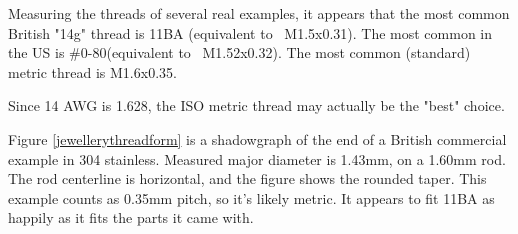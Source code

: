 Measuring the threads of several real examples, it appears that the most common British "14g" thread is 11BA (equivalent to ~M1.5x0.31).  The most common in the US is \#0-80(equivalent to ~M1.52x0.32).  The most common (standard) metric thread is M1.6x0.35.

Since 14 AWG is 1.628, the ISO metric thread may actually be the "best" choice.

Figure \ref{jewellerythreadform} is a shadowgraph of the end of a British commercial example in 304 stainless.  Measured major diameter is 1.43mm, on a 1.60mm rod. The rod centerline is horizontal, and the figure shows the rounded taper.  This example counts as 0.35mm pitch, so it's likely metric.  It appears to fit 11BA as happily as it fits the parts it came with.
\\ \\ \\ \\ \\ \\ \\ \\ \\ \\ \\ \\ \\ \\ \\ \\ \\ \\               



\clearpage
